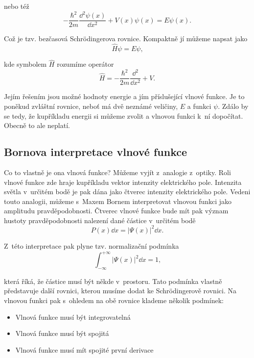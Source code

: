 \noindent nebo též
\begin{equation}
\boxed{-\frac{\hbar^2}{2m}\frac{\dd^2\psi(x)}{\dd x^2} + V(x)\psi(x) = E\psi(x) \mbox{.}}
\label{rov:Pohyboverovnice6}
\end{equation}

\noindent Což je tzv. bezčasová Schr\"odingerova rovnice. Kompaktně jí můžeme napsat jako
\begin{equation}
\hat{H}\psi = E\psi\mbox{,}
\label{rov:Pohyboverovnice7}
\end{equation}

\noindent kde symbolem $\hat{H}$ rozumíme operátor
\begin{equation}
\hat{H} = -\frac{\hbar^2}{2m}\frac{\dd^2}{\dd x^2} + V\mbox{.}
\label{rov:Pohyboverovnice8}
\end{equation}

\noindent Jejím řešením jsou možné hodnoty energie a jím příslušející vlnové funkce. Je to poněkud zvláštní rovnice, neboť má dvě neznámé veličiny, $E$ a funkci $\psi$. Zdálo by se tedy, že kupříkladu energii si můžeme zvolit a vlnovou funkci k~ní dopočítat. Obecně to ale neplatí. 

\subsection{Bornova interpretace vlnové funkce}
\label{kap:Bornova interpretace vlnové funkce}

Co to vlastně je ona vlnová funkce?  Můžeme vyjít z~analogie z~optiky. Roli vlnové funkce zde hraje kupříkladu vektor intenzity elektrického pole. Intenzita světla v~určitém bodě je pak dána jako čtverec intenzity elektrického pole.
Vedeni touto analogii, můžeme s~Maxem Bornem interpretovat vlnovou funkci jako amplitudu pravděpodobnosti. Čtverec vlnové funkce bude mít pak význam hustoty pravděpodobnosti nalezení dané částice v~určitém bodě
\begin{equation}
P(x)\dd x = |\Psi (x)|^2\dd x \mbox{.}
\label{rov:Born1}
\end{equation}

\noindent Z~této interpretace pak plyne tzv. normalizační podmínka
\begin{equation}
\int _{-\infty}^{+\infty} |\Psi(x)|^2 \dd x = 1\mbox{,}
\label{rov:Born2}
\end{equation}

\noindent která říká, že částice musí být někde v~prostoru. Tato podmínka vlastně představuje další rovnici, kterou musíme dodat ke Schr\"odingerově rovnici. Na vlnovou funkci pak s~ohledem na obě rovnice klademe několik podmínek:
\begin{itemize}
\item Vlnová funkce musí být integrovatelná
\item Vlnová funkce musí být spojitá
\item Vlnová funkce musí mít spojité první derivace
\end{itemize}

